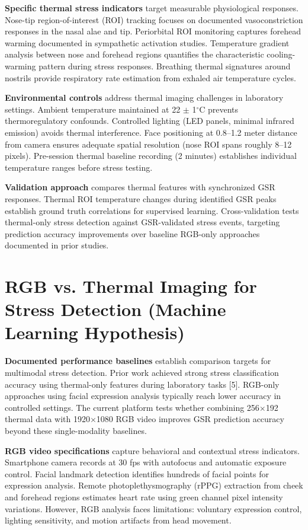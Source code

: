 \textbf{Specific thermal stress indicators} target measurable physiological responses. Nose-tip region-of-interest (ROI) tracking focuses on documented vasoconstriction responses in the nasal alae and tip. Periorbital ROI monitoring captures forehead warming documented in sympathetic activation studies. Temperature gradient analysis between nose and forehead regions quantifies the characteristic cooling-warming pattern during stress responses. Breathing thermal signatures around nostrils provide respiratory rate estimation from exhaled air temperature cycles.

\textbf{Environmental controls} address thermal imaging challenges in laboratory settings. Ambient temperature maintained at 22 $\pm$ 1$^\circ$C prevents thermoregulatory confounds. Controlled lighting (LED panels, minimal infrared emission) avoids thermal interference. Face positioning at 0.8--1.2 meter distance from camera ensures adequate spatial resolution (nose ROI spans roughly 8--12 pixels). Pre-session thermal baseline recording (2 minutes) establishes individual temperature ranges before stress testing.

\textbf{Validation approach} compares thermal features with synchronized GSR responses. Thermal ROI temperature changes during identified GSR peaks establish ground truth correlations for supervised learning. Cross-validation tests thermal-only stress detection against GSR-validated stress events, targeting prediction accuracy improvements over baseline RGB-only approaches documented in prior studies.

\section{RGB vs. Thermal Imaging for Stress Detection (Machine Learning Hypothesis)}
\textbf{Documented performance baselines} establish comparison targets for multimodal stress detection. Prior work achieved strong stress classification accuracy using thermal-only features during laboratory tasks [5]. RGB-only approaches using facial expression analysis typically reach lower accuracy in controlled settings. The current platform tests whether combining 256$\times$192 thermal data with 1920$\times$1080 RGB video improves GSR prediction accuracy beyond these single-modality baselines.

\textbf{RGB video specifications} capture behavioral and contextual stress indicators. Smartphone camera records at 30 fps with autofocus and automatic exposure control. Facial landmark detection identifies hundreds of facial points for expression analysis. Remote photoplethysmography (rPPG) extraction from cheek and forehead regions estimates heart rate using green channel pixel intensity variations. However, RGB analysis faces limitations: voluntary expression control, lighting sensitivity, and motion artifacts from head movement.

